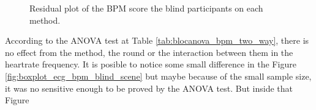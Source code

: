 \begin{figure}[!htb]
\begin{minipage}{0.45\textwidth}
        \caption{Residual plot of the BPM score the blind participants on each method.}
        \label{fig:residplot_bpm_two_way}
    \end{minipage}
\end{figure}


%


According to the ANOVA test at Table \ref{tab:blocanova_bpm_two_way}, there is no effect from the method, the round or the interaction between them in the heartrate frequency. It is posible to notice some small difference in the Figure \ref{fig:boxplot_ecg_bpm_blind_scene} but maybe because of the small sample size, it was no sensitive enough to be proved by the ANOVA test. But inside that Figure

\FloatBarrier